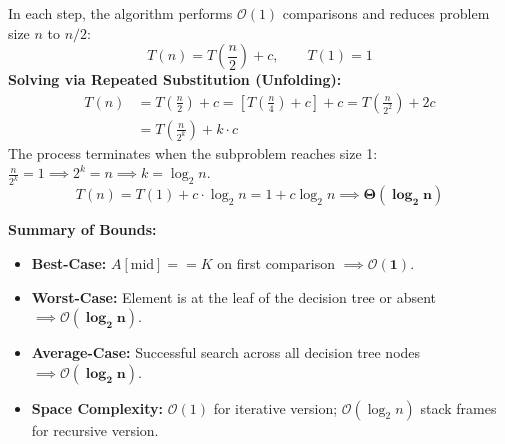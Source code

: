 \documentclass[12pt,a4paper]{article}
\begin{document}
\begin{tcolorbox}[formulabox, title={\textbf{Binary Search Recurrence Relation and Complexity Derivation}}]
In each step, the algorithm performs $\mathcal{O}(1)$ comparisons and reduces problem size $n$ to $n/2$:
\begin{equation}
  T(n) = T\left(\frac{n}{2}\right) + c, \qquad T(1) = 1
\end{equation}
\textbf{Solving via Repeated Substitution (Unfolding):}
\begin{align*}
  T(n) &= T\left(\frac{n}{2}\right) + c = \left[T\left(\frac{n}{4}\right) + c\right] + c = T\left(\frac{n}{2^2}\right) + 2c \\
       &= T\left(\frac{n}{2^k}\right) + k \cdot c
\end{align*}
The process terminates when the subproblem reaches size 1: $\frac{n}{2^k} = 1 \implies 2^k = n \implies k = \log_2 n$.
\begin{equation}
  T(n) = T(1) + c \cdot \log_2 n = 1 + c \log_2 n \implies \mathbf{\Theta(\log_2 n)}
\end{equation}
\par\vspace{2pt}\noindent
\textbf{Summary of Bounds:}
\begin{itemize}[leftmargin=*, nosep]
  \item \textbf{Best-Case:} $A[\text{mid}] == K$ on first comparison $\implies \mathbf{\mathcal{O}(1)}$.
  \item \textbf{Worst-Case:} Element is at the leaf of the decision tree or absent $\implies \mathbf{\mathcal{O}(\log_2 n)}$.
  \item \textbf{Average-Case:} Successful search across all decision tree nodes $\implies \mathbf{\mathcal{O}(\log_2 n)}$.
  \item \textbf{Space Complexity:} $\mathcal{O}(1)$ for iterative version; $\mathcal{O}(\log_2 n)$ stack frames for recursive version.
\end{itemize}
\end{tcolorbox}
\end{document}
